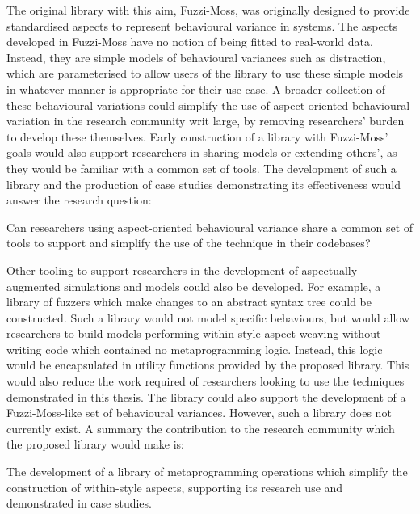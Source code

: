 The original library with this aim, Fuzzi-Moss, was originally designed to
provide standardised aspects to represent behavioural variance in
\sociotechnical systems. The aspects developed in Fuzzi-Moss have no notion of
being fitted to real-world data. Instead, they are simple models of behavioural
variances such as distraction, which are parameterised to allow users of the
library to use these simple models in whatever manner is appropriate for their
use-case. A broader collection of these behavioural variations could simplify
the use of aspect-oriented behavioural variation in the research community writ
large, by removing researchers' burden to develop these themselves. Early
construction of a library with Fuzzi-Moss' goals would also support researchers
in sharing models or extending others', as they would be familiar with a common
set of tools. The development of such a library and the production of case
studies demonstrating its effectiveness would answer the research question:

\begin{researchquestion}
    Can researchers using aspect-oriented behavioural variance share a common
    set of tools to support and simplify the use of the technique in their
    codebases?
\end{researchquestion}

Other tooling to support researchers in the development of aspectually augmented
simulations and models could also be developed. For example, a library of
fuzzers which make changes to an abstract syntax tree could be constructed. Such
a library would not model specific behaviours, but would allow researchers to
build models performing within-style aspect weaving without writing code which
contained no metaprogramming logic. Instead, this logic would be encapsulated in
utility functions provided by the proposed library. This would also reduce the
work required of researchers looking to use the techniques demonstrated in this
thesis. The library could also support the development of a Fuzzi-Moss-like set
of \sociotechnical behavioural variances. However, such a library does not
currently exist. A summary the contribution to the research community which the
proposed library would make is:

\begin{researchquestion}
    The development of a library of metaprogramming operations which simplify
    the construction of within-style aspects, supporting its research use and
    demonstrated in case studies.
\end{researchquestion}

